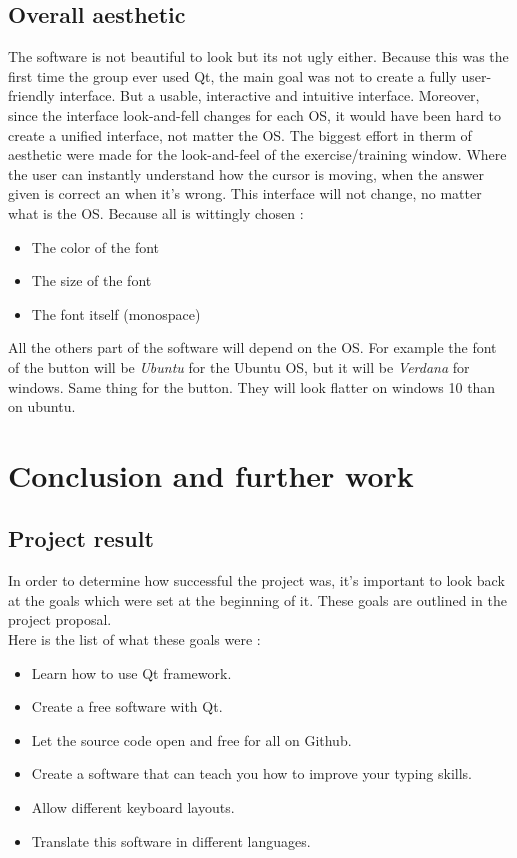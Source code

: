 \chapter{Overall aesthetic}
The software is not beautiful to look but its not ugly either. Because this was the first time the group ever used Qt, the main goal was not to create a fully user-friendly interface. But a usable, interactive and intuitive interface. Moreover, since the interface look-and-fell changes for each OS, it would have been hard to create a unified interface, not matter the OS. The biggest effort in therm of aesthetic were made for the look-and-feel of the exercise/training window. Where the user can instantly understand how the cursor is moving, when the answer given is correct an when it's wrong. This interface will not change, no matter what is the OS. Because all is wittingly chosen :
\begin{itemize}
	\item The color of the font
	\item The size of the font
	\item The font itself (monospace)
\end{itemize}
All the others part of the software will depend on the OS. For example the font of the button will be \textit{Ubuntu} for the Ubuntu OS, but it will be \textit{Verdana} for windows. Same thing for the button. They will look flatter on windows 10 than on ubuntu.


\part{Conclusion and further work}

\chapter{Project result}
In order to determine how successful the project was, it's important to look back at the goals which were set at the beginning of it. These goals are outlined in the project proposal.\\
Here is the list of what these goals were :

\begin{itemize}
	\item Learn how to use Qt framework.
	\item Create a free software with Qt.
	\item Let the source code open and free for all on Github.
	\item Create a software that can teach you how to improve your typing skills.
	\item Allow different keyboard layouts.
	\item Translate this software in different languages.
\end{itemize}

